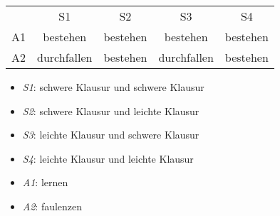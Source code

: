 \begin{tabular}{c|c|c|c|c|}
\multicolumn{1}{c}{}  & \multicolumn{1}{c}{S1}  & \multicolumn{1}{c}{S2}  & \multicolumn{1}{c}{S3}  & \multicolumn{1}{c}{S4} \\ \cline{2-5}
 A1 & bestehen & bestehen & bestehen & bestehen \\ \cline{2-5}
 A2 & durchfallen & bestehen & durchfallen & bestehen \\ \cline{2-5}
\end{tabular}
\begin{itemize}
\item {\em S1}: schwere Klausur und schwere Klausur

\item {\em S2}: schwere Klausur und leichte Klausur

\item {\em S3}: leichte Klausur und schwere Klausur

\item {\em S4}: leichte Klausur und leichte Klausur

\end{itemize}
\begin{itemize}
\item {\em A1}: lernen

\item {\em A2}: faulenzen

\end{itemize}
